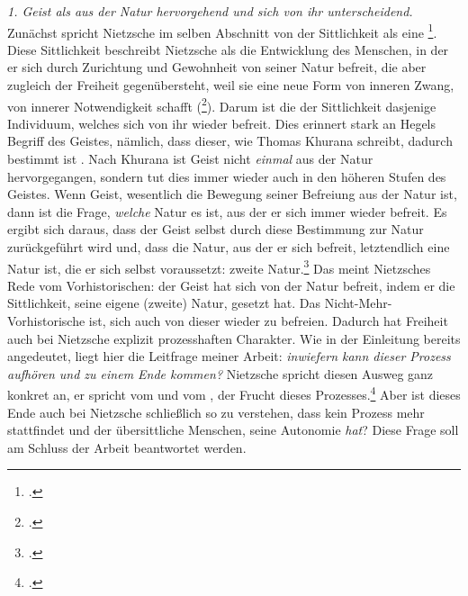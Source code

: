 \documentclass[12pt, a4paper, openany]{report}
\begin{document}
\emph{1. Geist als aus der Natur hervorgehend und sich von ihr unterscheidend.}\\
Zunächst spricht Nietzsche im selben Abschnitt von der Sittlichkeit als eine \footcite[][293]{nietzsche_jenseits_2014}.
Diese Sittlichkeit beschreibt Nietzsche als die Entwicklung des Menschen, in der er sich durch Zurichtung und Gewohnheit von seiner Natur befreit, die aber zugleich der Freiheit gegenübersteht, weil sie eine neue Form von inneren Zwang, von innerer Notwendigkeit schafft (\footcite[][292]{nietzsche_jenseits_2014}).
Darum ist die  der Sittlichkeit dasjenige Individuum, welches sich von ihr wieder befreit.
Dies erinnert stark an Hegels Begriff des Geistes, nämlich, dass dieser, wie Thomas Khurana schreibt, dadurch bestimmt ist .
Nach Khurana ist Geist nicht \emph{einmal} aus der Natur hervorgegangen, sondern tut dies immer wieder auch in den höheren Stufen des Geistes.
Wenn Geist, wesentlich die Bewegung seiner Befreiung aus der Natur ist, dann ist die Frage, \emph{welche} Natur es ist, aus der er sich immer wieder befreit. 
Es ergibt sich daraus, dass der Geist selbst durch diese Bestimmung zur Natur zurückgeführt wird und, dass die Natur, aus der er sich befreit, letztendlich eine Natur ist, die er sich selbst voraussetzt: zweite Natur.\footcite[Vgl.][320]{khurana_freiheit_2017}
Das meint Nietzsches Rede vom Vorhistorischen: 
der Geist hat sich von der Natur befreit, indem er die Sittlichkeit, seine eigene (zweite) Natur, gesetzt hat. 
Das Nicht-Mehr-Vorhistorische ist, sich auch von dieser wieder zu befreien.
Dadurch hat Freiheit auch bei Nietzsche explizit prozesshaften Charakter. 
Wie in der Einleitung bereits angedeutet, liegt hier die Leitfrage meiner Arbeit: \emph{inwiefern kann dieser Prozess aufhören und zu einem Ende kommen?}
Nietzsche spricht diesen Ausweg ganz konkret an, er spricht vom  und vom , der Frucht dieses Prozesses.\footcite[][293]{nietzsche_jenseits_2014} 
Aber ist dieses Ende auch bei Nietzsche schließlich so zu verstehen, dass kein Prozess mehr stattfindet und der übersittliche Menschen, seine Autonomie \emph{hat}?
Diese Frage soll am Schluss der Arbeit beantwortet werden.\\
\end{document}

